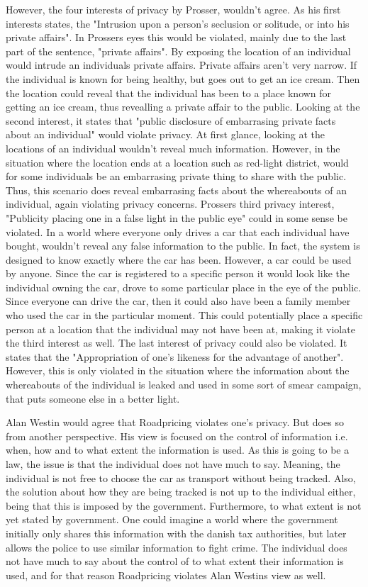 However, the four interests of privacy by Prosser, wouldn't agree. 
As his first interests states, the "Intrusion upon a person's seclusion or solitude, or into his private affairs". In Prossers eyes this would be violated, mainly due to the last part of the sentence, "private affairs". By exposing the location of an individual would intrude an individuals private affairs. Private affairs aren't very narrow. If the individual is known for being healthy, but goes out to get an ice cream. Then the location could reveal that the individual has been to a place known for getting an ice cream, thus revealling a private affair to the public.  
Looking at the second interest, it states that "public disclosure of embarrasing private facts about an individual" would violate privacy. At first glance, looking at the locations of an individual wouldn't reveal much information. However, in the situation where the location ends at a location such as red-light district, would for some individuals be an embarrasing private thing to share with the public. Thus, this scenario does reveal embarrasing facts about the whereabouts of an individual, again violating privacy concerns. Prossers third privacy interest, "Publicity placing one in a false light in the public eye" could in some sense be violated. In a world where everyone only drives a car that each individual have bought, wouldn't reveal any false information to the public. In fact, the system is designed to know exactly where the car has been. However, a car could be used by anyone. Since the car is registered to a specific person it would look like the individual owning the car, drove to some particular place in the eye of the public. Since everyone can drive the car, then it could also have been a family member who used the car in the particular moment. This could potentially place a specific person at a location that the individual may not have been at, making it violate the third interest as well. 
The last interest of privacy could also be violated. It states that the "Appropriation of one's likeness for the advantage of another". However, this is only violated in the situation where the information about the whereabouts of the individual is leaked and used in some sort of smear campaign, that puts someone else in a better light.  

Alan Westin would agree that Roadpricing violates one's privacy. But does so from another perspective. His view is focused on the control of information i.e. when, how and to what extent the information is used. As this is going to be a law, the issue is that the individual does not have much to say. Meaning, the individual is not free to choose the car as transport without being tracked. Also, the solution about how they are being tracked is not up to the individual either, being that this is imposed by the government. Furthermore, to what extent is not yet stated by government. One could imagine a world where the government initially only shares this information with the danish tax authorities, but later allows the police to use similar information to fight crime. The individual does not have much to say about the control of to what extent their information is used, and for that reason Roadpricing violates Alan Westins view as well.  

